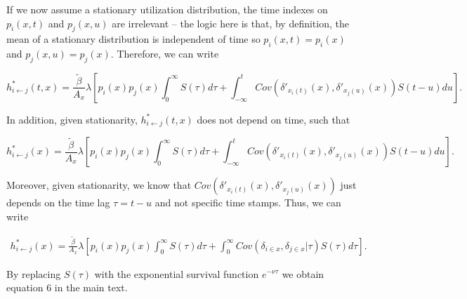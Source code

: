 \documentclass[letterpaper]{article}
\begin{document}
If we now assume a stationary utilization distribution, the time indexes on $p_i(x, t)$ and $p_j(x, u)$ are irrelevant -- the logic here is that, by definition, the mean of a stationary distribution is independent of time so $p_i(x, t) = p_i(x)$ and $p_j(x, u) = p_j(x)$. Therefore, we can write  

$$
h^*_{i \leftarrow j}(t, x) = \frac{\tilde{\beta}}{A_x} \lambda \left[p_i(x) p_j(x) \int_0^\infty S(\tau) d\tau  + \int_{-\infty}^t Cov(\delta'_{x_i(t)}(x), \delta'_{x_j(u)}(x)) S(t - u) du\right].
$$

In addition, given stationarity, $h^*_{i \leftarrow j}(t, x)$ does not depend on time, such that 

$$
h^*_{i \leftarrow j}(x) = \frac{\tilde{\beta}}{A_x} \lambda \left[p_i(x) p_j(x) \int_0^\infty S(\tau) d\tau  + \int_{-\infty}^t Cov(\delta'_{x_i(t)}(x), \delta'_{x_j(u)}(x)) S(t - u) du\right].
$$

Moreover, given stationarity, we know that $Cov(\delta'_{x_i(t)}(x), \delta'_{x_j(u)}(x))$ just depends on the time lag $\tau = t - u$ and not specific time stamps. Thus, we can write

\begin{equation}
    \begin{aligned}
   h^*_{i \leftarrow j}(x) = \frac{\tilde{\beta}}{A_x} \lambda \left[p_i(x)p_j(x) \int_0^\infty S(\tau) d\tau + \int_{0}^{\infty} Cov(\delta_{i \in x}, \delta_{j \in x} | \tau) S(\tau) d\tau\right].
    \end{aligned}
    \label{eq:foi_stationary}
\end{equation}

By replacing $S(\tau)$ with the exponential survival function $e^{-\nu \tau}$ we obtain equation 6 in the main text.



\end{document}

